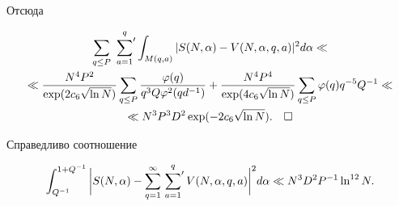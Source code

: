 Отсюда


\begin{multline*}


\sum_{q\le P}\,\sideset{}{'}\sum_{a=1}^{q}\int_{M(q,a)}


|S(N,\alpha) - V(N,\alpha,q,a)|^2d\alpha\ll \\


%


\ll \frac{N^4P^2}{\exp(2c_6\sqrt{\ln N})}


\sum_{q\le P}\frac{\varphi(q)}{q^3Q\varphi^2(qd^{-1})}+


\frac{N^4P^4}{\exp(4c_6\sqrt{\ln N})}\sum_{q\le P}\varphi(q)q^{-5}Q^{-1}\ll\\


%


\ll N^3P^3D^2\exp (-2c_6\sqrt{\ln N}).\quad\square


\end{multline*}





\begin{lems}


Справедливо соотношение


$$


\int_{Q^{-1}}^{1+Q^{-1}}


\bigg|S(N,\alpha) - \sum_{q=1}^{\infty}


\sideset{}{'}\sum_{a=1}^q V(N,\alpha, q, a)\bigg|^2 d\alpha \ll


N^3D^2P^{-1}\ln^{12} N.


$$


\end{lems}





